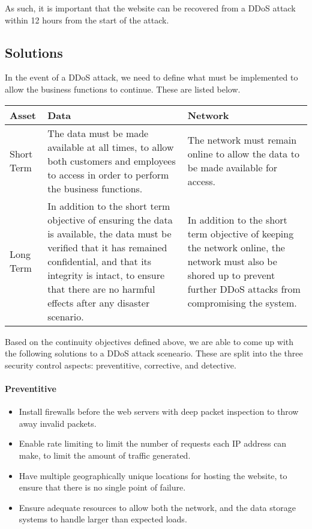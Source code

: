 \documentclass[12pt,a4paper]{article}
\begin{document}
As such, it is important that the website can be recovered from a DDoS attack within 12 hours from the start of the attack.

\subsection{Solutions}
In the event of a DDoS attack, we need to define what must be implemented to allow the business functions to continue. These are listed below.

\begin{table}[H]
  \centering
  \begin{tabulary}{\textwidth}{l|LL}
    \textbf{Asset} & \textbf{Data} & \textbf{Network} \\
    \hline
    Short Term &
    The data must be made available at all times, to allow both customers and employees to access in order to perform the business functions. &
    The network must remain online to allow the data to be made available for access. \\
    \hline
    Long Term &
    In addition to the short term objective of ensuring the data is available, the data must be verified that it has remained confidential, and that its integrity is intact, to ensure that there are no harmful effects after any disaster scenario. &
    In addition to the short term objective of keeping the network online, the network must also be shored up to prevent further DDoS attacks from compromising the system.
  \end{tabulary}
\end{table}

Based on the continuity objectives defined above, we are able to come up with the following solutions to a DDoS attack sceneario. These are split into the three security control aspects: preventitive, corrective, and detective.

\paragraph{Preventitive}
\begin{itemize}
\item Install firewalls before the web servers with deep packet inspection to throw away invalid packets.
\item Enable rate limiting to limit the number of requests each IP address can make, to limit the amount of traffic generated.
\item Have multiple geographically unique locations for hosting the website, to ensure that there is no single point of failure.
\item Ensure adequate resources to allow both the network, and the data storage systems to handle larger than expected loads.
\end{itemize}
\end{document}
